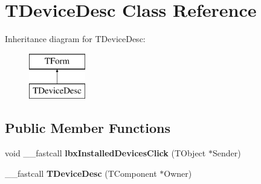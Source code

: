 \hypertarget{class_t_device_desc}{\section{T\+Device\+Desc Class Reference}
\label{class_t_device_desc}
}
Inheritance diagram for T\+Device\+Desc\+:\begin{figure}[H]
\begin{center}
\leavevmode
\includegraphics[height=2.000000cm]{class_t_device_desc}
\end{center}
\end{figure}
\subsection*{Public Member Functions}
\begin{DoxyCompactItemize}
\item 
\hypertarget{class_t_device_desc_ab53152429b01ea27c5c9f1055388afca}{void \+\_\+\+\_\+fastcall {\bfseries lbx\+Installed\+Devices\+Click} (T\+Object $\ast$Sender)}\label{class_t_device_desc_ab53152429b01ea27c5c9f1055388afca}

\item 
\hypertarget{class_t_device_desc_a54372f7af0c0910ecde1aaf085d92bb6}{\+\_\+\+\_\+fastcall {\bfseries T\+Device\+Desc} (T\+Component $\ast$Owner)}\label{class_t_device_desc_a54372f7af0c0910ecde1aaf085d92bb6}

\end{DoxyCompactItemize}
